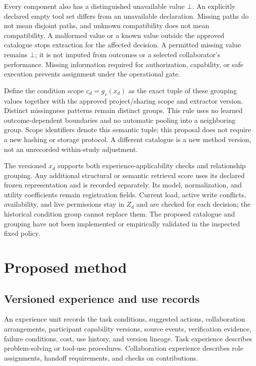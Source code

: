 \documentclass[
  english,
  11pt,
]{article}
\begin{document}
Every component also has a distinguished unavailable value \(\bot\). An
explicitly declared empty tool set differs from an unavailable
declaration. Missing paths do not mean disjoint paths, and unknown
compatibility does not mean compatibility. A malformed value or a known
value outside the approved catalogue stops extraction for the affected
decision. A permitted missing value remains \(\bot\); it is not imputed
from outcomes or a selected collaborator's performance. Missing
information required for authorization, capability, or safe execution
prevents assignment under the operational gate.

Define the condition scope \(c_d=g_v(x_d)\) as the exact tuple of these
grouping values together with the approved project/sharing scope and
extractor version. Distinct missingness patterns remain distinct groups.
This rule uses no learned outcome-dependent boundaries and no automatic
pooling into a neighboring group. Scope identifiers denote this semantic
tuple; this proposal does not require a new hashing or storage protocol.
A different catalogue is a new method version, not an unrecorded
within-study adjustment.

The versioned \(x_d\) supports both experience-applicability checks and
relationship grouping. Any additional structural or semantic retrieval
score uses its declared frozen representation and is recorded
separately. Its model, normalization, and utility coefficients remain
registration fields. Current load, active write conflicts, availability,
and live permissions stay in \(Z_d\) and are checked for each decision;
the historical condition group cannot replace them. The proposed
catalogue and grouping have not been implemented or empirically
validated in the inspected fixed policy.

\section{Proposed method}\label{proposed-method}

\subsection{Versioned experience and use
records}\label{versioned-experience-and-use-records}

An experience unit records the task conditions, suggested actions,
collaboration arrangements, participant capability versions, source
events, verification evidence, failure conditions, cost, use history,
and version lineage. Task experience describes problem-solving or
tool-use procedures. Collaboration experience describes role
assignments, handoff requirements, and checks on contributions.
\end{document}
